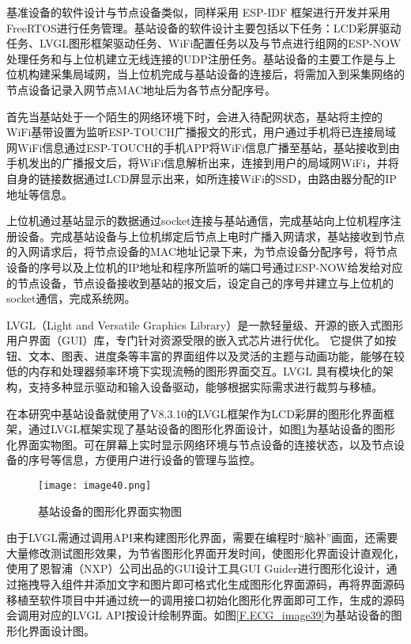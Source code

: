 基准设备的软件设计与节点设备类似，同样采用 ESP-IDF 框架进行开发并采用FreeRTOS进行任务管理。基站设备的软件设计主要包括以下任务：LCD彩屏驱动任务、LVGL图形框架驱动任务、WiFi配置任务以及与节点进行组网的ESP-NOW处理任务和与上位机建立无线连接的UDP注册任务。基站设备的主要工作是与上位机构建采集局域网，当上位机完成与基站设备的连接后，将需加入到采集网络的节点设备记录入网节点MAC地址后为各节点分配序号。

首先当基站处于一个陌生的网络环境下时，会进入待配网状态，基站将主控的WiFi基带设置为监听ESP-TOUCH广播报文的形式，用户通过手机将已连接局域网WiFi信息通过ESP-TOUCH的手机APP将WiFi信息广播至基站，基站接收到由手机发出的广播报文后，将WiFi信息解析出来，连接到用户的局域网WiFi，并将自身的链接数据通过LCD屏显示出来，如所连接WiFi的SSD，由路由器分配的IP地址等信息。

上位机通过基站显示的数据通过socket连接与基站通信，完成基站向上位机程序注册设备。完成基站设备与上位机绑定后节点上电时广播入网请求，基站接收到节点的入网请求后，将节点设备的MAC地址记录下来，为节点设备分配序号，将节点设备的序号以及上位机的IP地址和程序所监听的端口号通过ESP-NOW给发给对应的节点设备，节点设备接收到基站的报文后，设定自己的序号并建立与上位机的socket通信，完成系统网。

LVGL（Light and Versatile Graphics Library）是一款轻量级、开源的嵌入式图形用户界面（GUI）库，专门针对资源受限的嵌入式芯片进行优化。\cite{基于物联网心电图机的心电监测云平台设计与开发} 它提供了如按钮、文本、图表、进度条等丰富的界面组件以及灵活的主题与动画功能，能够在较低的内存和处理器频率环境下实现流畅的图形界面交互。LVGL 具有模块化的架构，支持多种显示驱动和输入设备驱动，能够根据实际需求进行裁剪与移植。\cite{基于感性工学的智能穿戴心电监测设备设计研究}

在本研究中基站设备就使用了V8.3.10的LVGL框架作为LCD彩屏的图形化界面框架，通过LVGL框架实现了基站设备的图形化界面设计，如图\ref{F.ECG_image40}为基站设备的图形化界面实物图。可在屏幕上实时显示网络环境与节点设备的连接状态，以及节点设备的序号等信息，方便用户进行设备的管理与监控。

\begin{figure}[htb]
    \centering
    \texttt{[image: image40.png]}
    \caption{基站设备的图形化界面实物图}
    \label{F.ECG_image40}
\end{figure}

由于LVGL需通过调用API来构建图形化界面，需要在编程时“脑补”画面，还需要大量修改测试图形效果，为节省图形化界面开发时间，使图形化界面设计直观化，使用了恩智浦（NXP）公司出品的GUI设计工具GUI Guider进行图形化设计，通过拖拽导入组件并添加文字和图片即可格式化生成图形化界面源码，再将界面源码移植至软件项目中并通过统一的调用接口初始化图形化界面即可工作，生成的源码会调用对应的LVGL API按设计绘制界面。如图\ref{F.ECG_image39}为基站设备的图形化界面设计图。

